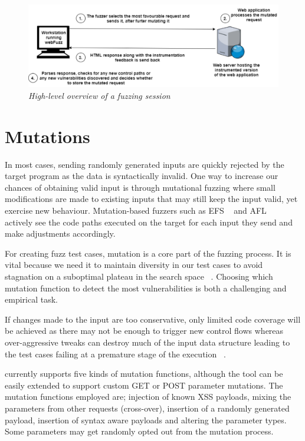 \begin{figure}[ht]
 \centering
 \captionsetup{justification=centering}
 \includegraphics[width=\linewidth]{figures/architecture.pdf}
 \caption[High-level overview of a \pname{} fuzzing session]{\textit{High-level overview of a \pname{} fuzzing session}}
 \label{fig:architecture}
\end{figure}

\section{Mutations}
In most cases, sending randomly generated inputs are quickly rejected by the target program as the data is syntactically invalid. One way to increase our chances of obtaining valid input is through mutational fuzzing where small modifications are made to existing inputs that may still keep the input valid, yet exercise new behaviour. Mutation-based fuzzers such as EFS ~\cite{efs2007} and AFL ~\cite{zalewski2015american} actively see the code paths executed on the target for each input they send and make adjustments accordingly. 

For creating fuzz test cases, mutation is a core part of the fuzzing process. It is vital because we need it to maintain diversity in our test cases to avoid stagnation on a suboptimal plateau in the search space ~\cite{seal2016Genetic}. Choosing which mutation function to detect the most vulnerabilities is both a challenging and empirical task. 

If changes made to the input are too conservative, only limited code coverage will be achieved as there may not be enough to trigger new control flows whereas over-aggressive tweaks can destroy much of the input data structure leading to the test cases failing at a premature stage of the execution ~\cite{zalewski2014Mutations}.

\pname{} currently supports five kinds of mutation functions, although the tool can be easily
extended to support custom GET or POST parameter mutations. The mutation functions employed are; injection of known XSS payloads, mixing the parameters from other requests (cross-over), insertion of a randomly generated payload, insertion of syntax aware payloads and altering the
parameter types. Some parameters may get randomly opted out from the mutation process. 

